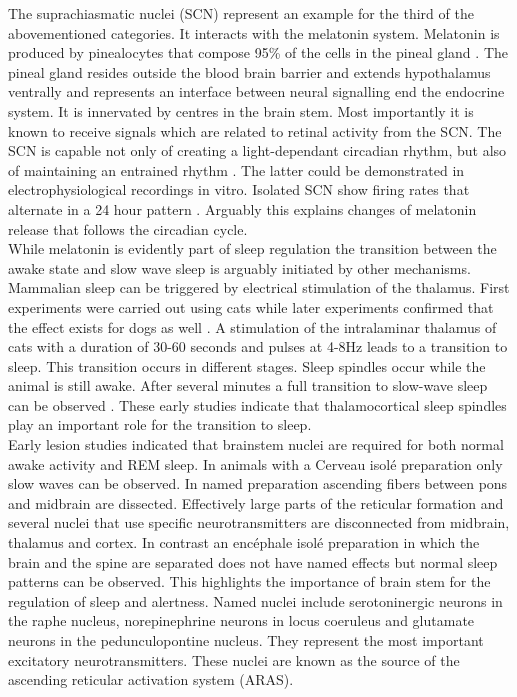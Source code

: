 The suprachiasmatic nuclei (SCN) represent an example for the third of the abovementioned categories. It interacts with the melatonin system. Melatonin is produced by pinealocytes that compose 95\% of the cells in the pineal gland \parencite{aulinas2019physiology}. The pineal gland resides outside the blood brain barrier and extends hypothalamus ventrally and represents an interface between neural signalling end the endocrine system. It is innervated by centres in the brain stem. Most importantly it is known to receive signals which are related to retinal activity from the SCN. The SCN is capable not only of creating a light-dependant circadian rhythm, but also of maintaining an entrained rhythm \parencite{koella1984organization}. The latter could be demonstrated in electrophysiological recordings in vitro. Isolated SCN show firing rates that alternate in a 24 hour pattern \parencite{de2011melatonergic}. Arguably this explains changes of melatonin release that follows the circadian cycle.\\
While melatonin is evidently part of sleep regulation the transition between the awake state and slow wave sleep is arguably initiated by other mechanisms. Mammalian sleep can be triggered by electrical stimulation of the thalamus. First experiments were carried out using cats while later experiments confirmed that the effect exists for dogs as well \parencite{akert1951sleep, akimoto1956sleep}. A stimulation of the intralaminar thalamus of cats with a duration of 30-60 seconds and pulses at 4-8Hz leads to a transition to sleep. This transition occurs in different stages. Sleep spindles occur while the animal is still awake. After several minutes a full transition to slow-wave sleep can be observed \parencite{akert1951sleep}. These early studies indicate that thalamocortical sleep spindles play an important role for the transition to sleep.\\
Early lesion studies indicated that brainstem nuclei are required for both normal awake activity and REM sleep. In animals with a Cerveau isolé preparation only slow waves can be observed. In named preparation ascending fibers between pons and midbrain are dissected. Effectively large parts of the reticular formation and several nuclei that use specific neurotransmitters are disconnected from midbrain, thalamus and cortex. In contrast an encéphale isolé preparation in which the brain and the spine are separated does not have named effects but normal sleep patterns can be observed. This highlights the importance of brain stem for the regulation of sleep and alertness. Named nuclei include serotoninergic neurons in the raphe nucleus, norepinephrine neurons in locus coeruleus and glutamate neurons in the pedunculopontine nucleus. They represent the most important excitatory neurotransmitters. These nuclei are known as the source of the ascending reticular activation system (ARAS).\\
